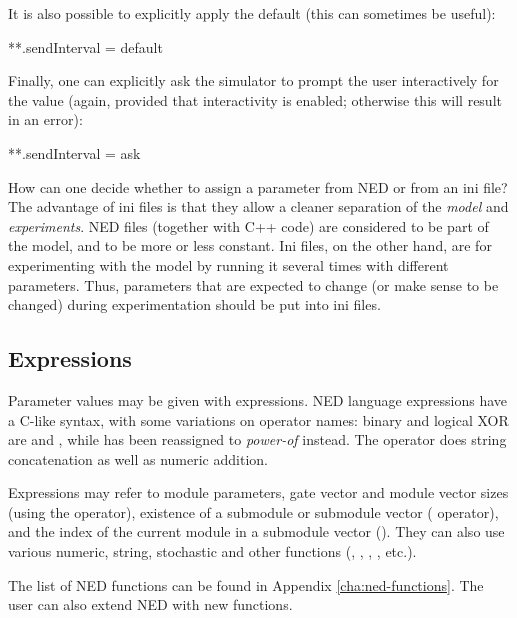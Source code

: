 It is also possible to explicitly apply the default (this can sometimes
be useful):

\begin{inifile}
**.sendInterval = default
\end{inifile}

Finally, one can explicitly ask the simulator to prompt the user interactively
for the value (again, provided that interactivity is enabled; otherwise
this will result in an error):

\begin{inifile}
**.sendInterval = ask
\end{inifile}

\begin{note}
    How can one decide whether to assign a parameter from NED or from an ini
    file? The advantage of ini files is that they allow a cleaner separation of the \textit{model}
    and \textit{experiments}. NED files (together with C++ code) are considered
    to be part of the model, and to be more or less constant. Ini files, on
    the other hand, are for experimenting with the model by running it
    several times with different parameters. Thus, parameters that are expected
    to change (or make sense to be changed) during experimentation should be
    put into ini files.
\end{note}


\subsection{Expressions}
\label{sec:ned-lang:expressions}

Parameter values may be given with expressions. NED language expressions
have a C-like syntax, with some variations on operator names: binary and
logical XOR are \ttt{\#} and \ttt{\#\#}, while \ttt{\^} has been reassigned
to \textit{power-of} instead. The \ttt{+} operator does string
concatenation as well as numeric addition.

Expressions may refer to module parameters, gate vector and module vector sizes
(using the  operator), existence of a submodule or submodule vector
( operator), and the index of the current module in a
submodule vector (). They can also use various numeric, string,
stochastic and other functions (, , ,
, etc.).

\begin{note}
    The list of NED functions can be found in Appendix \ref{cha:ned-functions}.
    The user can also extend NED with new functions.
\end{note}

